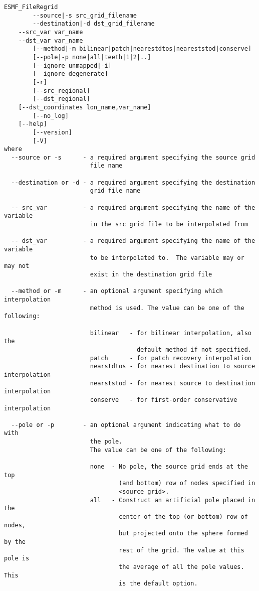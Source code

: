 \begin{verbatim}
ESMF_FileRegrid  
        --source|-s src_grid_filename
        --destination|-d dst_grid_filename
	--src_var var_name
	--dst_var var_name
        [--method|-m bilinear|patch|nearestdtos|neareststod|conserve]
        [--pole|-p none|all|teeth|1|2|..]
        [--ignore_unmapped|-i]
        [--ignore_degenerate]
        [-r]
        [--src_regional]
        [--dst_regional]
	[--dst_coordinates lon_name,var_name]
        [--no_log]
	[--help]
        [--version]
        [-V]
where
  --source or -s      - a required argument specifying the source grid
                        file name

  --destination or -d - a required argument specifying the destination
                        grid file name

  -- src_var          - a required argument specifying the name of the variable 
                        in the src grid file to be interpolated from

  -- dst_var          - a required argument specifying the name of the variable 
                        to be interpolated to.  The variable may or may not 
                        exist in the destination grid file

  --method or -m      - an optional argument specifying which interpolation
                        method is used. The value can be one of the following:

                        bilinear   - for bilinear interpolation, also the
                                     default method if not specified.
                        patch      - for patch recovery interpolation
                        nearstdtos - for nearest destination to source interpolation
                        nearststod - for nearest source to destination interpolation
                        conserve   - for first-order conservative interpolation

  --pole or -p        - an optional argument indicating what to do with
                        the pole.
                        The value can be one of the following:

                        none  - No pole, the source grid ends at the top
                                (and bottom) row of nodes specified in
                                <source grid>.
                        all   - Construct an artificial pole placed in the
                                center of the top (or bottom) row of nodes,
                                but projected onto the sphere formed by the
                                rest of the grid. The value at this pole is
                                the average of all the pole values. This
                                is the default option.


\end{verbatim}
